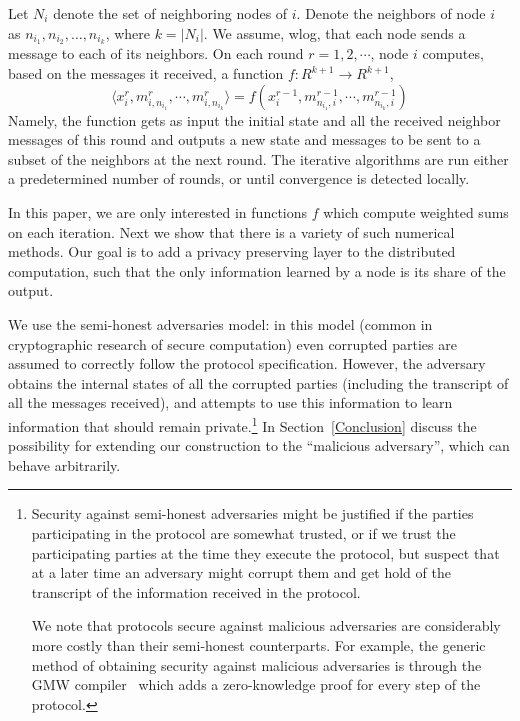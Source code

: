 \documentclass[times, 10pt,twocolumn]{article}
\begin{document}
Let $N_i$ denote the set of neighboring nodes of $i$.  Denote the
neighbors of node $i$ as $n_{i_1},n_{i_2},\ldots,n_{i_k}$, where
$k=|N_i|$.  We assume, wlog, that each node sends a message to each of
its neighbors.  On each round $r = 1,2,\cdots$, node $i$ computes,
based on the messages it received, a function $f: R^{k+1} \rightarrow
R^{k+1}$, \[ \langle x_i^r, m^{r}_{i,n_{i_1}}, \cdots, m^{r}_{i,n_{i_k}}\rangle =
f(x_i^{r-1}, m^{r-1}_{n_{i_1},i}, \cdots , m^{r-1}_{n_{i_k},i}) \]
Namely, the function gets as input the initial state and all the
received neighbor messages of this round and outputs a new state and
messages to be sent to a subset of the neighbors at the next
round. The iterative algorithms are run either a predetermined number
of rounds, or until convergence is detected locally.

In this paper, we are only interested in functions $f$ which
compute weighted sums on each iteration. Next we show that there
is a variety of such numerical methods. Our goal is to add a
privacy preserving layer to the distributed computation, such that
the only information learned by a node is its share of the output.



We use the semi-honest adversaries model: in this model (common in
cryptographic research of secure computation) even corrupted parties
are assumed to correctly follow the protocol specification. However,
the adversary obtains the internal states of all the corrupted parties
(including the transcript of all the messages received), and attempts
to use this information to learn information that should remain
private.\footnote{Security against semi-honest adversaries might be
  justified if the parties participating in the protocol are somewhat
  trusted, or if we trust the participating parties at the time they
  execute the protocol, but suspect that at a later time an adversary
  might corrupt them and get hold of the transcript of the information
  received in the protocol.

  We note that protocols secure against malicious adversaries are
  considerably more costly than their semi-honest counterparts. For
  example, the generic method of obtaining security against malicious
  adversaries is through the GMW compiler~\cite{GMW} which adds a
  zero-knowledge proof for every step of the protocol.}  In
Section~\ref{Conclusion} discuss the possibility for extending our
construction to the ``malicious adversary'', which can behave
arbitrarily.
\end{document}
